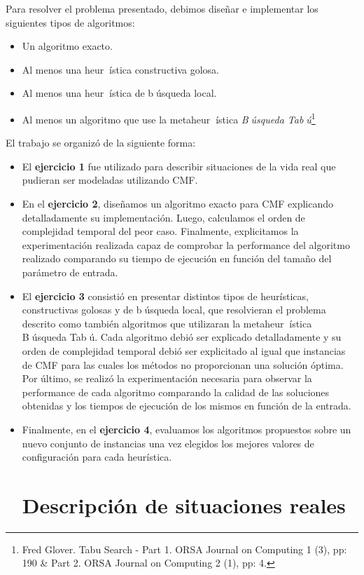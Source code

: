 \documentclass[10pt, a4paper]{article}
\begin{document}
Para resolver el problema presentado, debimos diseñar e implementar los siguientes tipos de algoritmos:

\begin{itemize}
 \item Un algoritmo exacto.
 \item Al menos una heurística constructiva golosa.
 \item Al menos una heurística de búsqueda local.
 \item Al menos un algoritmo que use la metaheurística \textit{Búsqueda Tabú}\footnote{Fred Glover. Tabu Search - Part 1. ORSA Journal on Computing 1 (3), pp: 190 \& Part 2. ORSA Journal on Computing 2 (1), pp: 4.}
\end{itemize}

El trabajo se organizó de la siguiente forma:
\begin{itemize}
\item El \textbf{ejercicio 1} fue utilizado para describir situaciones de la vida real que pudieran ser modeladas utilizando CMF.
\item En el \textbf{ejercicio 2}, diseñamos un algoritmo exacto para CMF explicando detalladamente su implementación. Luego, calculamos el orden de complejidad temporal del peor caso. Finalmente, explicitamos la experimentación realizada capaz de comprobar la performance del algoritmo realizado comparando su tiempo de ejecución en función del tamaño del parámetro de entrada.
\item El \textbf{ejercicio 3} consistió en presentar distintos tipos de heurísticas, constructivas golosas y de búsqueda local, que resolvieran el problema descrito como también algoritmos que utilizaran la metaheurística Búsqueda Tabú. Cada algoritmo debió ser explicado detalladamente y su orden de complejidad temporal debió ser explicitado al igual que instancias de CMF para las cuales los métodos no proporcionan una solución óptima. Por último, se realizó la experimentación necesaria para observar la performance de cada algoritmo comparando la calidad de las soluciones obtenidas y los tiempos de ejecución de los mismos en función de la entrada.
\item Finalmente, en el \textbf{ejercicio 4}, evaluamos los algoritmos propuestos sobre un nuevo conjunto de instancias una vez elegidos los mejores valores de configuración para cada heurística.
\newpage

\section{Descripción de situaciones reales}

\newpage


\end{itemize}
\end{document}
